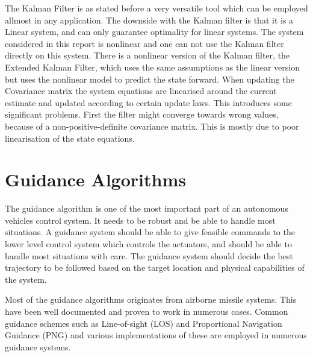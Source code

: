 	The Kalman Filter is as stated before a very versatile tool which can be employed allmost in
	any application. The downside with the Kalman filter is that it is a Linear system, and can only
	guarantee optimality for linear systems. The system considered in this report is nonlinear and one can not
	use the Kalman filter directly on this system. There is a nonlinear version of the Kalman filter, the
	Extended Kalman Filter, which uses the same assumptions as the linear version but uses the nonlinear
	model to predict the state forward. When updating the Covariance matrix the system equations are
	linearised around the current estimate and updated according to certain update laws. This introduces
some
	significant problems. First the filter might converge towards wrong values, because of a non-positive-definite
	covariance matrix. This is mostly due to poor linearisation of the state equations. \cite{kalman}
	
\section{Guidance Algorithms}
        \label{chap1-guidance-alg}
        The guidance algorithm is one of the most important part of an autonomous vehicles control system. It
	needs to be robust and be able to handle most situations. A guidance system should be able to give
	feasible commands to the lower level control system which controls the actuators, and should be able
	to handle most situations with care. The guidance system should decide the best trajectory to be
	followed based on the target location and physical capabilities of the system.\cite{GuidanceReview}

	Most of the guidance algorithms originates from airborne missile systems. This have been well
	documented and proven to work in numerous cases. Common guidance schemes such as Line-of-sight (LOS)
	and Proportional Navigation Guidance (PNG) and various implementations of these are employed in
	numerous guidance systems.
	
